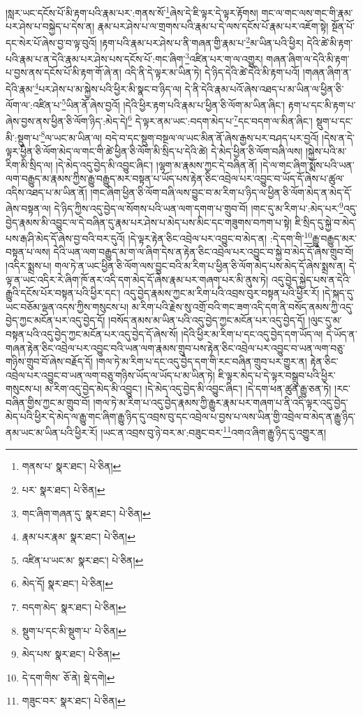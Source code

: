 །སླར་ཡང་དངོས་པོ་མི་རྟག་པའི་རྣམ་པར་:གནས་སོ་\footnote{གནས་པ་  སྣར་ཐང་།  པེ་ཅིན། }ཞེས་དེ་ཇི་ལྟར་དེ་ལྟར་རྟོགས། གང་ལ་གང་ལས་གང་གི་རྣམ་པར་ཤེས་པ་བསྐྱེད་པ་དེས་ན། རྣམ་པར་ཤེས་པ་ལ་གྲགས་པའི་རྣམ་པ་དེ་ལས་དངོས་པོ་རྣམ་པར་འཇོག་སྟེ། སྔོན་པོ་དང་སེར་པོ་ཞེས་བྱ་བ་ལྟ་བུའོ། །རྟག་པའི་རྣམ་པར་ཤེས་པ་ནི་གཞན་གྱི་རྣམ་པ་\footnote{པར་  སྣར་ཐང་།  པེ་ཅིན། }མ་ཡིན་པའི་ཕྱིར། དེའི་ཚེ་མི་རྟག་པའི་རྣམ་པ་ན་དེའི་རྣམ་པར་ཤེས་པས་དངོས་པོ་:གང་ཞིག་\footnote{གང་ཞིག་གཞན་དུ་  སྣར་ཐང་།  པེ་ཅིན། }འཛིན་པར་ག་ལ་འགྱུར། གཞན་ཞིག་ལ་དེའི་མི་རྟག་པ་བྱས་ནས་དངོས་པོ་མི་རྟག་གོ་ཞེ་ན། འདི་ནི་དེ་ལྟར་མ་ཡིན་ཏེ། དེ་ཉིད་དེའི་ཚེ་དེའི་མི་རྟག་པའོ། །གཞན་ཞིག་ན་དེའི་རྣམ་\footnote{རྣམ་པར་རྣམ་  སྣར་ཐང་།  པེ་ཅིན། }པར་ཤེས་པ་མ་སྐྱེས་པའི་ཕྱིར་མི་སྣང་བ་ཉིད་ལ། དེ་ནི་དེའི་རྣམ་པའོ་ཞེས་འཐད་པ་མ་ཡིན་ལ་ཕྱིན་ཅི་ལོག་ལ་:འཛིན་པ་\footnote{འཛིན་པ་ཡང་མ་  སྣར་ཐང་།  པེ་ཅིན། }ཡིན་ནོ་ཞེས་བྱའོ། །དེའི་ཕྱིར་རྟག་པའི་རྣམ་པ་ཕྱིན་ཅི་ལོག་མ་ཡིན་ཞིང་། རྟག་པ་དང་མི་རྟག་པ་ཞེས་བྱས་ནས་ཕྱིན་ཅི་ལོག་ཉིད་:མེད་དེ།\footnote{མེད་དོ།  སྣར་ཐང་།  པེ་ཅིན། } དེ་ལྟར་ནམ་ཡང་:བདག་མེད་པ་\footnote{བདག་མེད་  སྣར་ཐང་།  པེ་ཅིན། }དང་བདག་ལ་མིན་ཞིང་། སྡུག་པ་དང་མི་:སྡུག་པ་\footnote{སྡུག་པ་དང་མི་སྡུག་པ་  པེ་ཅིན། }ལ་ཡང་མ་ཡིན་ལ། བདེ་བ་དང་སྡུག་བསྔལ་ལ་ཡང་མིན་ནོ་ཞེས་རྒྱས་པར་བཤད་པར་བྱའོ། །དེས་ན་དེ་ལྟར་ཕྱིན་ཅི་ལོག་མེད་ལ་གང་གི་ཚེ་ཕྱིན་ཅི་ལོག་མི་སྲིད་པ་དེའི་ཚེ། དེ་མེད་ཕྱིན་ཅི་ལོག་བཞི་ལས། །སྐྱེས་པའི་མ་རིག་མི་སྲིད་ལ། །དེ་མེད་འདུ་བྱེད་མི་འབྱུང་ཞིང་། །ལྷག་མ་རྣམས་ཀྱང་དེ་བཞིན་ནོ། །དེ་ལ་གང་ཞིག་སྨོས་པའི་ཡན་ལག་བརྒྱུད་མ་རྣམས་ཀྱིས་རྒྱུ་བརྒྱུད་མར་བསྟན་པ་ཡོད་པས་རྟེན་ཅིང་འབྲེལ་པར་འབྱུང་བ་ཡོད་དོ་ཞེས་པ་ཚུལ་འདིས་འཐད་པ་མ་ཡིན་ནོ། །གང་ཞིག་ཕྱིན་ཅི་ལོག་བཞི་ལས་བྱུང་བ་མ་རིག་པ་ཉིད་ལ་ཕྱིན་ཅི་ལོག་མེད་ན་མེད་དོ་ཞེས་བསྟན་ལ། དེ་ཉིད་ཀྱིས་འདུ་བྱེད་ལ་སོགས་པའི་ཡན་ལག་དགག་པ་གྲུབ་བོ། །གང་དུ་མ་རིག་པ་:མེད་པར་\footnote{མེད་པས་  སྣར་ཐང་།  པེ་ཅིན། }འདུ་བྱེད་རྣམས་མི་འབྱུང་ལ་དེ་བཞིན་དུ་རྣམ་པར་ཤེས་པ་མེད་པས་མིང་དང་གཟུགས་བཀག་པ་སྟེ། ཇི་སྲིད་དུ་སྐྱེ་བ་མེད་པས་རྒ་ཤི་མེད་དོ་ཞེས་བྱ་བའི་བར་དུའོ། །དེ་ལྟར་རྟེན་ཅིང་འབྲེལ་པར་འབྱུང་བ་མེད་ན། :དེ་དག་གི་\footnote{དེ་དག་གིས་  ཅོ་ནེ།  སྡེ་དགེ། }རྒྱུ་བརྒྱུད་མར་བསྟན་པ་ལས། དེའི་ཡན་ལག་བརྒྱུད་མ་ག་ལ་ཞིག་དེས་ན་རྟེན་ཅིང་འབྲེལ་པར་འབྱུང་བ་སྐྱེ་བ་མེད་དོ་ཞེས་གྲུབ་བོ། །འདིར་སྨྲས་པ། གལ་ཏེ་ན་ཡང་ཕྱིན་ཅི་ལོག་ལས་བྱུང་བའི་མ་རིག་པ་ཕྱིན་ཅི་ལོག་མེད་པས་མེད་དོ་ཞེས་སྨྲས་ན། དེ་ལྟ་ན་ཡང་འདིར་རེ་ཞིག་ཁོ་ནར་འདི་དག་མེད་དོ་ཞེས་རྣམ་པར་གཞག་པར་མི་ནུས་ཏེ། འདུ་བྱེད་སྐྱེད་པས་ན་དེའི་རྒྱུའི་དངོས་པོར་བསྟན་པའི་ཕྱིར་དང་། འདུ་བྱེད་རྣམས་ཀྱང་མ་རིག་པའི་འབྲས་བུར་བསྟན་པའི་ཕྱིར་རོ། །དེ་སྐད་དུ་ཡང་བཅོམ་ལྡན་འདས་ཀྱིས་གསུངས་པ། མ་རིག་པའི་རྗེས་སུ་འགྲོ་བའི་གང་ཟག་འདི་དག་ནི་བསོད་ནམས་ཀྱི་འདུ་བྱེད་ཀྱང་མངོན་པར་འདུ་བྱེད་དོ། །བསོད་ནམས་མ་ཡིན་པའི་འདུ་བྱེད་ཀྱང་མངོན་པར་འདུ་བྱེད་དོ། །ལུང་དུ་མ་བསྟན་པའི་འདུ་བྱེད་ཀྱང་མངོན་པར་འདུ་བྱེད་དོ་ཞེས་སོ། །དེའི་ཕྱིར་མ་རིག་པ་དང་འདུ་བྱེད་དག་ཡོད་ལ། དེ་ཡོད་ན་གཞན་རྟེན་ཅིང་འབྲེལ་པར་འབྱུང་བའི་ཡན་ལག་རྣམས་གྲུབ་པས་རྟེན་ཅིང་འབྲེལ་པར་འབྱུང་བ་ཡན་ལག་བཅུ་གཉིས་གྲུབ་བོ་ཞེས་བརྗོད་དོ། །གལ་ཏེ་མ་རིག་པ་དང་འདུ་བྱེད་དག་གི་རང་བཞིན་གྲུབ་པར་གྱུར་ན། རྟེན་ཅིང་འབྲེལ་པར་འབྱུང་བ་ཡན་ལག་བཅུ་གཉིས་ཡོད་ལ་ཡོད་པ་མ་ཡིན་ཏེ། ཇི་ལྟར་མེད་པ་དེ་ལྟར་བསྒྲུབ་པའི་ཕྱིར་གསུངས་པ། མ་རིག་འདུ་བྱེད་མེད་མི་འབྱུང་། །དེ་མེད་འདུ་བྱེད་མི་འབྱུང་ཞིང་། །དེ་དག་ཕན་ཚུན་རྒྱུ་ཅན་ཏེ། །རང་བཞིན་གྱིས་ཀྱང་མ་གྲུབ་བོ། །གལ་ཏེ་མ་རིག་པ་འདུ་བྱེད་རྣམས་ཀྱི་རྒྱུར་རྣམ་པར་གཞག་པ་ནི་འདི་ལྟར་འདུ་བྱེད་མེད་པའི་ཕྱིར་དེ་མེད་ལ་རྒྱུ་གང་ཞིག་རྒྱུ་ཉིད་དུ་འབྲས་བུ་དང་འབྲེལ་པ་བྱས་པ་ལས་ཡིན་གྱི་འབྲེལ་བ་མེད་ན་རྒྱུ་ཉིད་ནམ་ཡང་མ་ཡིན་པའི་ཕྱིར་རོ། །ཡང་ན་འབྲས་བུ་ཉེ་བར་མ་:བཟུང་བར་\footnote{གཟུང་བར་  སྣར་ཐང་།  པེ་ཅིན། }འགའ་ཞིག་རྒྱུ་ཉིད་དུ་འགྱུར་ན། 
